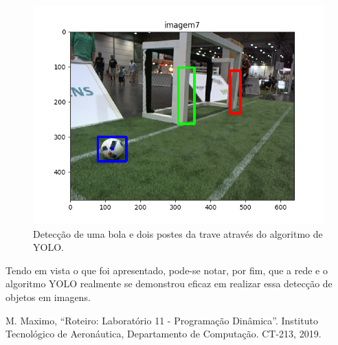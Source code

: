 \documentclass[conference]{IEEEtran}
\begin{document}

\begin{figure}[htbp]
\centering
\centerline{\includegraphics[scale=0.5]{imagens/imagem7_detection.png}}
\caption{Detecção de uma bola e dois postes da trave através do algoritmo de YOLO.}
\label{imagem7_detection}
\end{figure}




Tendo em vista o que foi apresentado, pode-se notar, por fim, que a rede e o algoritmo YOLO realmente se demonstrou eficaz em realizar essa detecção de objetos em imagens.

\begin{thebibliography}{00}
 M. Maximo, ``Roteiro: Laboratório 11 - Programação Dinâmica''. Instituto Tecnológico de Aeronáutica, Departamento de Computação. CT-213, 2019.
\end{thebibliography}
\end{document}

